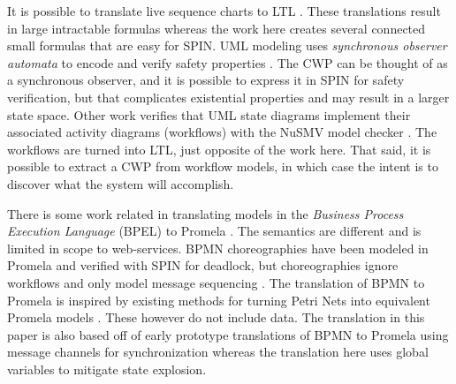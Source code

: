 It is possible to translate live sequence charts to LTL \cite{KUMAR, KUMAR2009137}. These translations result in large intractable formulas whereas the work here creates several connected small formulas that are easy for SPIN. UML modeling uses \emph{synchronous observer automata} to encode and verify safety properties \cite{8906967}. The CWP can be thought of as a synchronous observer, and it is possible to express it in SPIN for safety verification, but that complicates existential properties and may result in a larger state space. Other work verifies that UML state diagrams implement their associated activity diagrams (workflows) with the NuSMV model checker \cite{7436156}. The workflows are turned into LTL, just opposite of the work here. That said, it is possible to extract a CWP from workflow models, in which case the intent is to discover what the system will accomplish.

There is some work related in translating models in the \emph{Business Process Execution Language} (BPEL) to Promela \cite{bpelToPromela}. The semantics are different and is limited in scope to web-services. BPMN choreographies have been modeled in Promela and verified with SPIN for deadlock, but choreographies ignore workflows and only model message sequencing \cite{choreography}. The translation of BPMN to Promela is inspired by existing methods for turning Petri Nets into equivalent Promela models \cite{petrinetToPromela, petrinetInspiration}. These however do not include data. The translation in this paper is also based off of early prototype translations of BPMN to Promela using message channels for synchronization \cite{bpmn2promela} whereas the translation here uses global variables to mitigate state explosion.